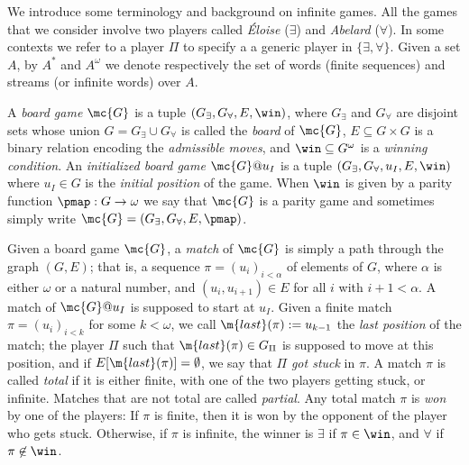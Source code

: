 We introduce some terminology and background on infinite games.
All the games that we consider involve two players called \emph{\'Eloise}
($\exists$) and \emph{Abelard} ($\forall$).
In some contexts we refer to a player $\Pi$ to specify a
a generic player in $\{\exists,\forall\}$.
%
Given a set $A$, by $A^*$ and $A^\omega$ we denote respectively the set of
words (finite sequences) and streams (or infinite words) over $A$.

A \emph{board game} $\mc{G}$ is a tuple $(G_{\exists},G_{\forall},E,\win)$,
where $G_{\exists}$ and $G_{\forall}$ are disjoint sets whose union
$G=G_{\exists}\cup G_{\forall}$ is called the \emph{board} of $\mc{G}$,
$E\subseteq G \times G$ is a binary relation encoding the \emph{admissible
moves}, and $\win \subseteq G^{\omega}$ is a \emph{winning condition}.
An \emph{initialized board game} $\mc{G}@u_I$ is a tuple
$(G_{\exists},G_{\forall},u_I, E,\win)$ where
$u_I \in G$ is the
\emph{initial position} of the game.
When $\win$ is  given by a parity function
$\pmap: G \to \omega$ we say that $\mc{G}$ is a parity game and sometimes
simply write $\mc{G}=(G_{\exists},G_{\forall},E,\pmap)$.

Given a board game $\mc{G}$, a \emph{match} of $\mc{G}$ is simply a path
through the graph $(G,E)$; that is, a sequence $\pi = (u_i)_{i< \alpha}$ of
elements of $G$, where $\alpha$ is either $\omega$ or a natural number,
and $(u_i,u_{i+1}) \in E$ for all $i$ with $i+1 < \alpha$.
A match of $\mc{G}@u_{I}$ is supposed to start at $u_{I}$.
Given a finite match $\pi = (u_i)_{i< k}$ for some $k<\omega$, we call
$\m{last}(\pi) := u_{k-1}$ the \emph{last position} of the match; the
player $\Pi$ such that $\m{last}(\pi) \in G_{\Pi}$ is supposed to move
at this position, and if $E[\m{last}(\pi)] = \emptyset$, we say that
$\Pi$ \emph{got stuck} in $\pi$.
%
A match $\pi$ is called \emph{total} if it is either finite, with one of the
two players getting stuck, or infinite. Matches that are not total are called
\emph{partial}.
Any total match $\pi$ is \emph{won} by one of the players:
If $\pi$ is finite, then it is won by the opponent of the player who gets stuck.
Otherwise, if $\pi$ is infinite, the winner is $\exists$ if $\pi \in
\win$, and $\forall$ if $\pi \not\in \win$.

